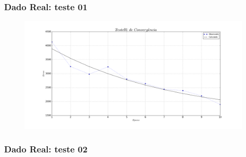 \documentclass[aspectratio=10]{beamer} %
\begin{document}
\begin{frame}
	\frametitle{Dado Real: teste 01}
	\begin{figure}[H]
		\centering
			\includegraphics[scale=0.2]{Imagens/conv01.png}
		\label{Conv01}
	\end{figure} 
\end{frame}

\begin{frame}
	\frametitle{Dado Real: teste 02}
	\begin{figure}[H]
		\centering
		\qquad
		\qquad
		\qquad
		\label{SOMt02}
	\end{figure}
\end{frame}
\end{document}
